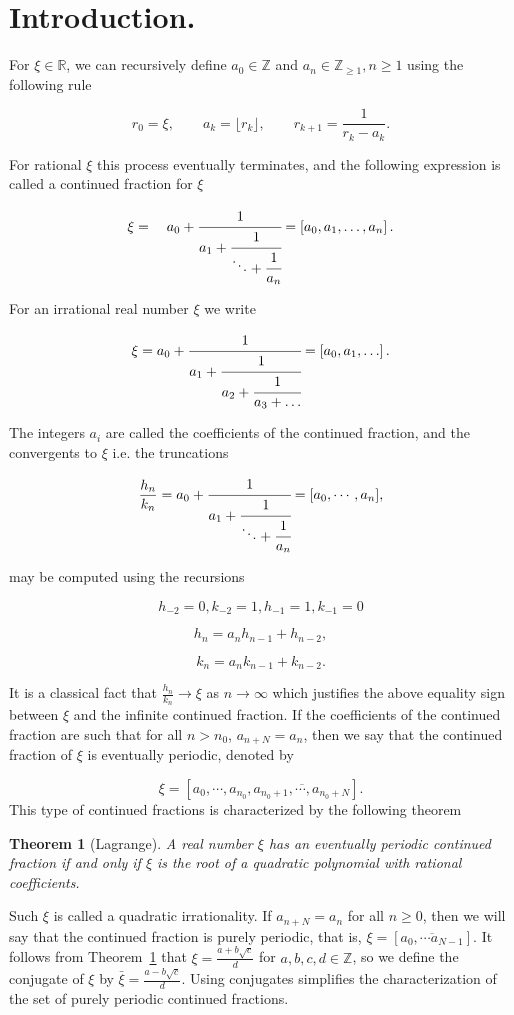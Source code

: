 \documentclass[]{interact}
\theoremstyle{plain}
\numberwithin{equation}{section} %
\newtheorem{theorem}[thm]{Theorem}
\numberwithin{table}{section} %
\numberwithin{figure}{section}
\begin{document}
\section{Introduction. }

For $\xi\in \mathbb R$, we can recursively define $a_0\in \mathbb{Z}$ and  $a_{n}\in \mathbb{Z}_{\geq 1}, n\geq 1$ using the following rule

\[
r_0=\xi,\qquad a_k=\lfloor r_k\rfloor,\qquad
r_{k+1}=\frac{1}{r_k-a_k}.
\]

For rational $\xi$ this process eventually terminates, and the following expression is called a continued fraction for $\xi$
    
$$\xi=\quad a_0+\cfrac{1}{a_1+\cfrac{1}{\ddots +\cfrac{1}{a_n}}}=\left[a_0, a_1, \ldots, a_n\right].$$


For an irrational real number $\xi$ we write  

$$\xi=a_0+\cfrac{1}{a_1+\cfrac{1}{a_2+\cfrac{1}{a_3+\ldots}}}=\left[a_0, a_1, \ldots\right].$$

The integers $a_i$ are called the coefficients of the continued fraction, and the convergents to $\xi$ i.e. the truncations 

$$\frac{h_n}{k_n}=a_0+\cfrac{1}{a_1+\cfrac{1}{\ddots +\cfrac{1}{a_n}}}=[a_0,\cdots,a_n],$$

may be computed using the recursions

$$h_{-2}=0, k_{-2}=1, h_{-1}=1,k_{-1}=0$$

$$h_n=a_nh_{n-1}+h_{n-2},$$

$$k_{n}=a_nk_{n-1}+k_{n-2}.$$
 
It is a classical fact that $\frac{h_n}{k_n}\to \xi$ as $n\to \infty$ which justifies the above equality sign between $\xi$ and the infinite continued fraction. If the coefficients of the continued fraction are such that for all $n> n_0$,  $a_{n+N}=a_n$, then we say that the continued fraction of $\xi$ is eventually periodic, denoted by

$$\xi=[a_0,\cdots, a_{n_0},\overline{a_{n_0+1},\cdots,a_{n_0+N}}].$$
This type of continued fractions is characterized by the following theorem 

\begin{theorem}[Lagrange]\label{th1}
A real number $\xi$ has an eventually periodic continued fraction if and only if $\xi$ is the root of a quadratic polynomial with rational coefficients.
\end{theorem} 

  Such $\xi$ is called a quadratic irrationality. If $a_{n+N}=a_{n}$ for all $n\geq 0$, then we will say that the continued fraction is purely periodic, that is, $\xi=[\overline{a_0,\cdots a_{N-1}}]$.  It follows from Theorem~\ref{th1} that $\xi=\frac{a+b\sqrt{c}}{d}$ for $a,b,c,d\in\mathbb Z$, so we define the conjugate of $\xi$ by $\bar{\xi}=\frac{a-b\sqrt{c}}{d}$. Using conjugates simplifies the characterization of the set of purely periodic continued fractions.
\end{document}
